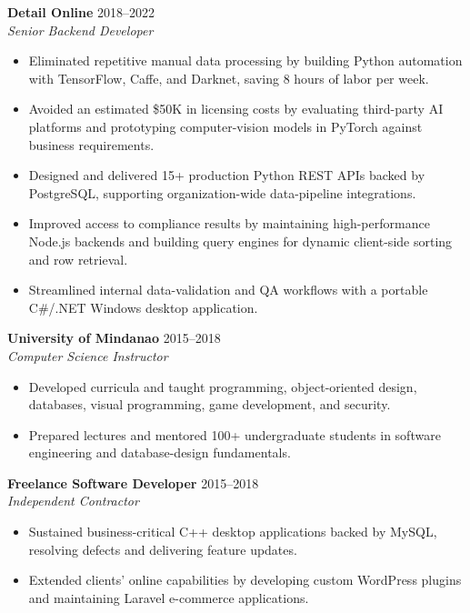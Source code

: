 \documentclass[11pt,letterpaper]{article}
\begin{document}
\vspace{8pt}

\noindent
\textbf{Detail Online} \hfill 2018--2022 \\
\textit{Senior Backend Developer}
\begin{itemize}
    \item Eliminated repetitive manual data processing by building Python automation with TensorFlow, Caffe, and Darknet, saving 8 hours of labor per week.
    \item Avoided an estimated \$50K in licensing costs by evaluating third-party AI platforms and prototyping computer-vision models in PyTorch against business requirements.
    \item Designed and delivered 15+ production Python REST APIs backed by PostgreSQL, supporting organization-wide data-pipeline integrations.
    \item Improved access to compliance results by maintaining high-performance Node.js backends and building query engines for dynamic client-side sorting and row retrieval.
    \item Streamlined internal data-validation and QA workflows with a portable C\#/.NET Windows desktop application.
\end{itemize}

\vspace{8pt}

\noindent
\textbf{University of Mindanao} \hfill 2015--2018 \\
\textit{Computer Science Instructor}
\begin{itemize}
    \item Developed curricula and taught programming, object-oriented design, databases, visual programming, game development, and security.
    \item Prepared lectures and mentored 100+ undergraduate students in software engineering and database-design fundamentals.
\end{itemize}

\vspace{8pt}

\noindent
\textbf{Freelance Software Developer} \hfill 2015--2018 \\
\textit{Independent Contractor}
\begin{itemize}
    \item Sustained business-critical C++ desktop applications backed by MySQL, resolving defects and delivering feature updates.
    \item Extended clients' online capabilities by developing custom WordPress plugins and maintaining Laravel e-commerce applications.
\end{itemize}
\end{document}
